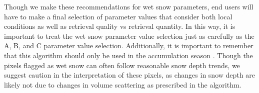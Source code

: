 \documentclass[journal abbreviation, manuscript]{copernicus}
\begin{document}
Though we make these recommendations for wet snow parameters, end users will have to make a final selection of parameter values that consider both local conditions as well as retrieval quality vs retrieval quantity. In this way, it is important to treat the wet snow parameter value selection just as carefully as the A, B, and C parameter value selection. Additionally, it is important to remember that this algorithm should only be used in the accumulation season \citep{Tsang.2022}. Though the pixels flagged as wet snow can often follow reasonable snow depth trends, we suggest caution in the interpretation of these pixels, as changes in snow depth are likely not due to changes in volume scattering as prescribed in the algorithm.

\noappendix       %




\appendixfigures  %

\appendixtables   %





\end{document}
